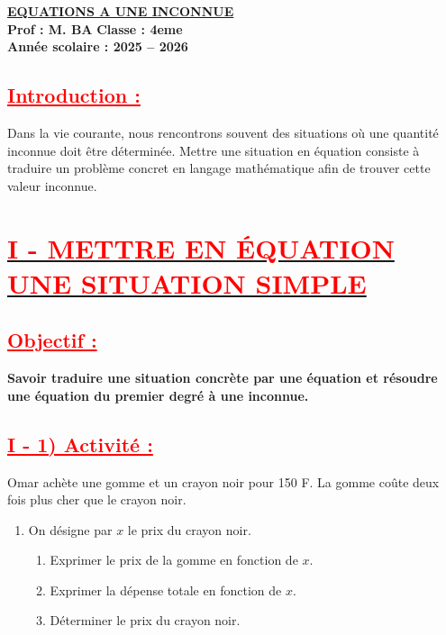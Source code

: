 \documentclass[12pt,a4paper]{article}
\begin{document}
\begin{center}
    \Large\textbf{\underline{ EQUATIONS A UNE INCONNUE }}\\[-0.1cm]
    \normalsize\textbf{Prof : M. BA} \hfill \textbf{Classe : 4eme}\\[-0.1cm]
    \textbf{Année scolaire : 2025 -- 2026}
\end{center}



\subsection*{\textcolor{red}{\underline{Introduction :}}}

Dans la vie courante, nous rencontrons souvent des situations où une quantité inconnue doit être déterminée.  
Mettre une situation en équation consiste à traduire un problème concret en langage mathématique afin de trouver cette valeur inconnue.


\section*{\underline{\textcolor{red}{I - METTRE EN ÉQUATION UNE SITUATION SIMPLE}}}

\subsection*{\textcolor{red}{\underline{Objectif :}}}
\textbf{Savoir traduire une situation concrète par une équation et résoudre une équation du premier degré à une inconnue.}

\vspace{0.3cm}

\subsection*{\textcolor{red}{\underline{I - 1) Activité :}}}

Omar achète une gomme et un crayon noir pour 150 F.  
La gomme coûte deux fois plus cher que le crayon noir.

\begin{enumerate}
    \item On désigne par $x$ le prix du crayon noir.
    
    \begin{enumerate}
        \item Exprimer le prix de la gomme en fonction de $x$.
        \item Exprimer la dépense totale en fonction de $x$.
        \item Déterminer le prix du crayon noir.
    \end{enumerate}
\end{enumerate}
\end{document}
